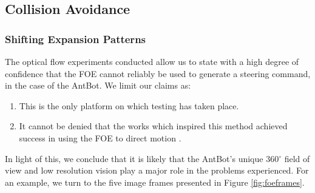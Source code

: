 \documentclass[a4paper,11pt,twoside,openright]{article}
\begin{document}
\subsection{Collision Avoidance}
\subsubsection{Shifting Expansion Patterns}
The optical flow experiments conducted allow us to state with a high
degree of confidence that the FOE cannot reliably be used to generate
a steering command, in the case of the AntBot. We limit our claims as:

\begin{enumerate}
\item{This is the only platform on which testing has taken place.}
\item{It cannot be denied that the works which inspired this method
    achieved success in using the FOE to direct motion
    \cite{Stewart2010, Vanderstap2012}.}
\end{enumerate}

In light of this, we conclude that it is likely that the AntBot's unique
360$^\circ$ field of view and low resolution vision play a major role
in the problems experienced. For an example, we turn to the five image
frames presented in Figure \ref{fig:foeframes}.
\newline\par
\end{document}
